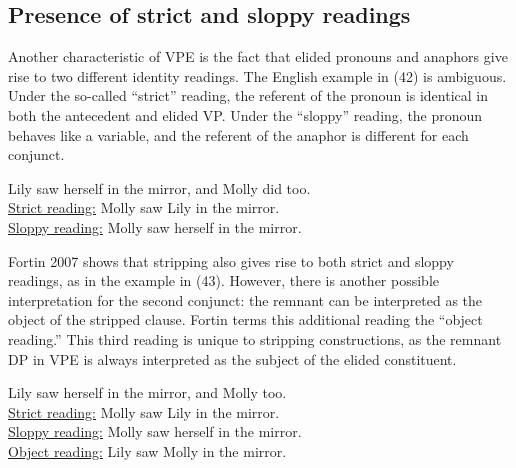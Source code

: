 \documentclass[output=paper]{LSP/langsci}
\begin{document}
\subsection{Presence of strict and sloppy readings}

Another characteristic of VPE is the fact that elided pronouns and anaphors give rise to two different identity readings. The English example in (42) is ambiguous. Under the so-called ``strict'' reading, the referent of the pronoun is identical in both the antecedent and elided VP. Under the ``sloppy'' reading, the pronoun behaves like a variable, and the referent of the anaphor is different for each conjunct.

\begin{exe}
\ex
Lily saw herself in the mirror, and Molly did too.\\
\underline{Strict reading:} Molly saw Lily in the mirror.\\
\underline{Sloppy reading:} Molly saw herself in the mirror.
\end{exe}

Fortin 2007 shows that stripping also gives rise to both strict and sloppy readings, as in the example in (43). However, there is another possible interpretation for the second conjunct: the remnant can be interpreted as the object of the stripped clause. Fortin terms this additional reading the ``object reading.'' This third reading is unique to stripping constructions, as the remnant DP in VPE is always interpreted as the subject of the elided constituent. 

\begin{exe}
\ex
Lily saw herself in the mirror, and Molly too.\\
\underline{Strict reading:} Molly saw Lily in the mirror.\\
\underline{Sloppy reading:} Molly saw herself in the mirror.\\
\underline{Object reading:} Lily saw Molly in the mirror.
\end{exe}
\end{document}
